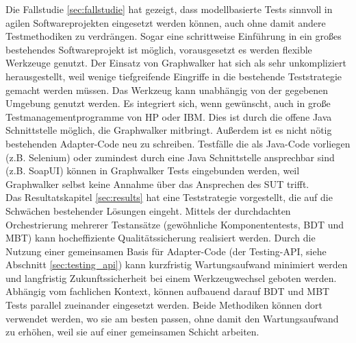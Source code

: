 Die Fallstudie \ref{sec:fallstudie}  hat gezeigt, dass modellbasierte Tests sinnvoll in agilen Softwareprojekten eingesetzt werden können, auch ohne damit andere Testmethodiken zu verdrängen. Sogar eine schrittweise Einführung in ein großes bestehendes Softwareprojekt ist möglich, vorausgesetzt es werden flexible Werkzeuge genutzt. Der Einsatz von Graphwalker hat sich als sehr unkompliziert herausgestellt, weil wenige tiefgreifende Eingriffe in die bestehende Teststrategie gemacht werden müssen. Das Werkzeug kann unabhängig von der gegebenen Umgebung genutzt werden. Es integriert sich, wenn gewünscht, auch in große Testmanagementprogramme von HP oder IBM. Dies ist durch die offene Java Schnittstelle möglich, die Graphwalker mitbringt. Außerdem ist es nicht nötig bestehenden Adapter-Code neu zu schreiben. Testfälle die als Java-Code vorliegen (z.B. Selenium) oder zumindest durch eine Java Schnittstelle ansprechbar sind (z.B. SoapUI) können in Graphwalker Tests eingebunden werden, weil Graphwalker selbst keine Annahme über das Ansprechen des \Gls{SUT} trifft.\\
Das Resultatskapitel \ref{sec:results} hat eine Teststrategie vorgestellt, die auf die Schwächen bestehender Lösungen eingeht. Mittels der durchdachten Orchestrierung mehrerer Testansätze (gewöhnliche Komponententests, \Gls{BDT} und \Gls{MBT}) kann hocheffiziente Qualitätssicherung realisiert werden. Durch die Nutzung einer gemeinsamen Basis für Adapter-Code (der Testing-API, siehe Abschnitt \ref{sec:testing_api}) kann kurzfristig Wartungsaufwand minimiert werden und langfristig Zukunftssicherheit bei einem Werkzeugwechsel geboten werden. 
Abhängig vom fachlichen Kontext, können aufbauend darauf \Gls{BDT} und \Gls{MBT} Tests parallel zueinander eingesetzt werden. Beide Methodiken können dort verwendet werden, wo sie am besten passen, ohne damit den Wartungsaufwand zu erhöhen, weil sie auf einer gemeinsamen Schicht arbeiten.\\

